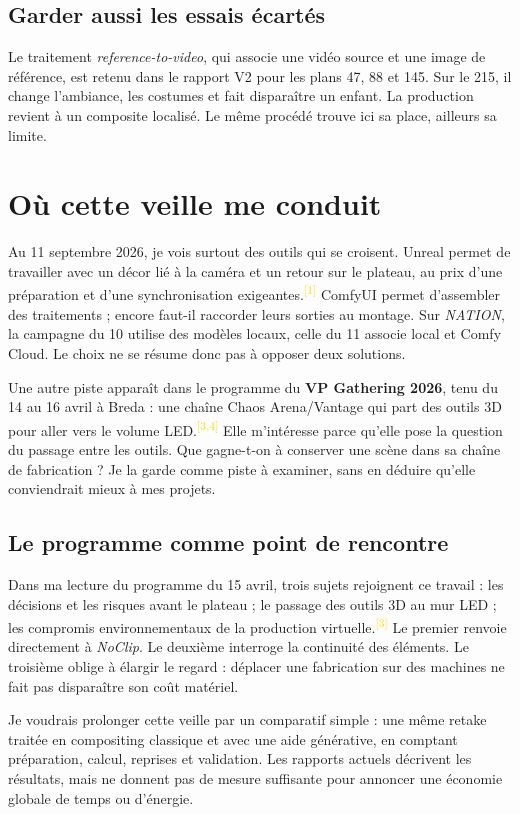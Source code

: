 \documentclass[11pt,a4paper]{article}
\newcommand{\src}[1]{\textsuperscript{\textcolor{gold}{[#1]}}}
\begin{document}
\subsection{Garder aussi les essais écartés}
Le traitement \emph{reference-to-video}, qui associe une vidéo source et une image de référence, est retenu dans le rapport V2 pour les plans 47, 88 et 145. Sur le 215, il change l'ambiance, les costumes et fait disparaître un enfant. La production revient à un composite localisé. Le même procédé trouve ici sa place, ailleurs sa limite.

\newpage
\section{Où cette veille me conduit}
Au 11 septembre 2026, je vois surtout des outils qui se croisent. Unreal permet de travailler avec un décor lié à la caméra et un retour sur le plateau, au prix d'une préparation et d'une synchronisation exigeantes.\src{1} ComfyUI permet d'assembler des traitements ; encore faut-il raccorder leurs sorties au montage. Sur \emph{NATION}, la campagne du 10 utilise des modèles locaux, celle du 11 associe local et Comfy Cloud. Le choix ne se résume donc pas à opposer deux solutions.

Une autre piste apparaît dans le programme du \textbf{VP Gathering 2026}, tenu du 14 au 16 avril à Breda : une chaîne Chaos Arena/Vantage qui part des outils 3D pour aller vers le volume LED.\src{3,4} Elle m'intéresse parce qu'elle pose la question du passage entre les outils. Que gagne-t-on à conserver une scène dans sa chaîne de fabrication ? Je la garde comme piste à examiner, sans en déduire qu'elle conviendrait mieux à mes projets.

\subsection{Le programme comme point de rencontre}
Dans ma lecture du programme du 15 avril, trois sujets rejoignent ce travail : les décisions et les risques avant le plateau ; le passage des outils 3D au mur LED ; les compromis environnementaux de la production virtuelle.\src{3} Le premier renvoie directement à \emph{NoClip}. Le deuxième interroge la continuité des éléments. Le troisième oblige à élargir le regard : déplacer une fabrication sur des machines ne fait pas disparaître son coût matériel.

Je voudrais prolonger cette veille par un comparatif simple : une même retake traitée en compositing classique et avec une aide générative, en comptant préparation, calcul, reprises et validation. Les rapports actuels décrivent les résultats, mais ne donnent pas de mesure suffisante pour annoncer une économie globale de temps ou d'énergie.
\end{document}
